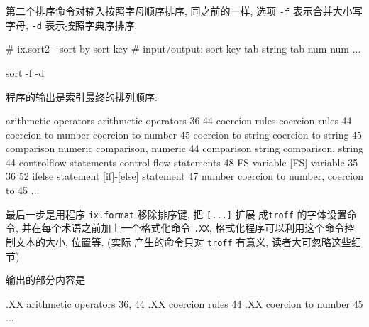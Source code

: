 第二个排序命令对输入按照字母顺序排序, 同之前的一样, 选项 \texttt{-f}
表示合并大小写字母, \texttt{-d} 表示按照字典序排序.
\begin{awkcode}
    # ix.sort2 - sort by sort key
    #     input/output: sort-key tab string tab num num ...

    sort -f -d
\end{awkcode}
程序的输出是索引最终的排列顺序:
\begin{awkcode}
    arithmetic operators        arithmetic operators    36 44
    coercion rules      coercion rules  44
    coercion to number  coercion to number      45
    coercion to string  coercion to string      45
    comparison numeric  comparison, numeric     44
    comparison string   comparison, string      44
    controlflow statements      control-flow statements 48
    FS variable [FS] variable   35 36 52
    ifelse statement    [if]-[else] statement   47
    number coercion to  number, coercion to     45
    ...
\end{awkcode}

最后一步是用程序 \texttt{ix.format} 移除排序键, 把 \texttt{[...]} 扩展
成\texttt{troff} 的字体设置命令, 并在每个术语之前加上一个格式化命令
\texttt{.XX}, 格式化程序可以利用这个命令控制文本的大小, 位置等. (实际 
产生的命令只对 \texttt{troff} 有意义, 读者大可忽略这些细节)
输出的部分内容是
\begin{awkcode}
    .XX
    arithmetic operators  36, 44
    .XX
    coercion rules  44
    .XX
    coercion to number  45
    ...
\end{awkcode}

